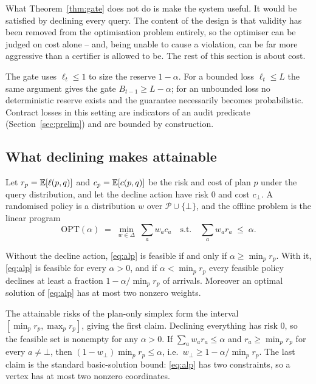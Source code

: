 What Theorem~\ref{thm:gate} does not do is make the system useful. It
would be satisfied by declining every query. The content of the design
is that validity has been removed from the optimisation problem
entirely, so the optimiser can be judged on cost alone -- and, being
unable to cause a violation, can be far more aggressive than a
certifier is allowed to be. The rest of this section is about cost.

\begin{rmk}
The gate uses $\ell_t \le 1$ to size the reserve $1-\alpha$. For a
bounded loss $\ell_t \le L$ the same argument gives the gate
$B_{t-1}\ge L-\alpha$; for an unbounded loss no deterministic reserve
exists and the guarantee necessarily becomes probabilistic. Contract
losses in this setting are indicators of an audit predicate
(Section~\ref{sec:prelim}) and are bounded by construction.
\end{rmk}

\subsection{What declining makes attainable}
\label{sec:feasible}

Let $r_p = \mathbb{E}[\ell(p,q)]$ and $c_p = \mathbb{E}[c(p,q)]$ be the risk and cost of
plan $p$ under the query distribution, and let the decline action have
risk $0$ and cost $c_\bot$. A randomised policy is a distribution $w$
over $\mathcal{P}\cup\{\bot\}$, and the offline problem is the linear
program
\begin{equation}
\label{eq:alp}
\mathrm{OPT}(\alpha) \;=\;
\min_{w \in \Delta} \; \sum_a w_a c_a
\quad\text{s.t.}\quad \sum_a w_a r_a \;\le\; \alpha .
\end{equation}

\begin{proposition}
\label{prop:feasible}
Without the decline action, \eqref{eq:alp} is feasible if and only if
$\alpha \ge \min_p r_p$. With it, \eqref{eq:alp} is feasible for every
$\alpha > 0$, and if $\alpha < \min_p r_p$ every feasible policy
declines at least a fraction $1 - \alpha/\min_p r_p$ of arrivals.
Moreover an optimal solution of \eqref{eq:alp} has at most two nonzero
weights.
\end{proposition}

\begin{pf}
The attainable risks of the plan-only simplex form the interval
$[\min_p r_p, \max_p r_p]$, giving the first claim. Declining
everything has risk $0$, so the feasible set is nonempty for any
$\alpha>0$. If $\sum_a w_a r_a \le \alpha$ and $r_a \ge \min_p r_p$ for
every $a \ne \bot$, then $(1-w_\bot)\min_p r_p \le \alpha$, i.e.\
$w_\bot \ge 1 - \alpha/\min_p r_p$. The last claim is the standard
basic-solution bound: \eqref{eq:alp} has two constraints, so a vertex
has at most two nonzero coordinates.
\end{pf}

